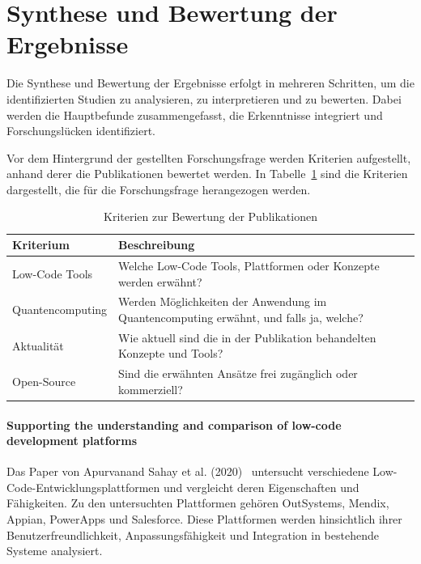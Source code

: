 
\section{Synthese und Bewertung der Ergebnisse}
Die Synthese und Bewertung der Ergebnisse erfolgt in mehreren Schritten, um die identifizierten Studien zu analysieren, 
zu interpretieren und zu bewerten. Dabei werden die Hauptbefunde zusammengefasst, die Erkenntnisse integriert und 
Forschungslücken identifiziert. 

Vor dem Hintergrund der gestellten Forschungsfrage werden Kriterien aufgestellt, anhand derer die Publikationen 
bewertet werden. In Tabelle~\ref{tab:evaluation_criteria} sind die Kriterien dargestellt, die für die Forschungsfrage 
herangezogen werden. 

\begin{table}[h!]
    \centering
    \caption{Kriterien zur Bewertung der Publikationen}
    \label{tab:evaluation_criteria}
    \begin{tabular}{|p{5cm}|p{9cm}|}
    \hline
    \textbf{Kriterium} & \textbf{Beschreibung} \\ \hline
    Low-Code Tools & Welche Low-Code Tools, Plattformen oder Konzepte werden erwähnt? \\ \hline
    Quantencomputing & Werden Möglichkeiten der Anwendung im Quantencomputing erwähnt, und falls ja, welche? \\ \hline
    Aktualität & Wie aktuell sind die in der Publikation behandelten Konzepte und Tools? \\ \hline
    Open-Source & Sind die erwähnten Ansätze frei zugänglich oder kommerziell? \\ \hline
    \end{tabular}
\end{table}

\paragraph{Supporting the understanding and comparison of low-code development platforms}

Das Paper von Apurvanand Sahay et al. (2020)~\cite{Sahay_2020} untersucht verschiedene Low-Code-Entwicklungsplattformen und vergleicht deren 
Eigenschaften und Fähigkeiten. Zu den untersuchten Plattformen gehören OutSystems, Mendix, Appian, PowerApps und Salesforce. 
Diese Plattformen werden hinsichtlich ihrer Benutzerfreundlichkeit, Anpassungsfähigkeit und Integration in bestehende Systeme analysiert.

